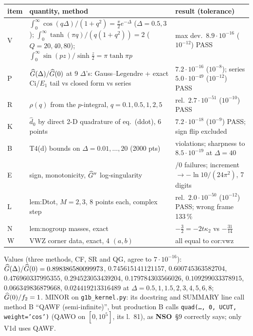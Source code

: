 \documentclass[11pt]{article}
\newcommand{\doc}{\textbf{NSO}}
\begin{document}
\begin{center}\small
\begin{tabularx}{\textwidth}{>{\raggedright\arraybackslash}p{} >{\raggedright\arraybackslash}X >{\raggedright\arraybackslash}p{}}\toprule
item & quantity, method & result (tolerance)\\\midrule
V & $\int_0^\infty\cos(q\Delta)/(1+q^2)=\frac\pi2e^{-\Delta}$ ($\Delta=0.5,3$); $\int_0^\infty\tanh(\pi q)/(q(1+q^2))=2$ ($Q=20,40,80$);
 $\int_0^\infty\sin(pz)/\sinh\frac z2=\pi\tanh\pi p$ & max dev.\ $8.9\cdot10^{-16}$ ($10^{-12}$) PASS\\
P & $\widehat G(\Delta)/\widehat G(0)$ at 9 $\Delta$'s: Gauss--Legendre + exact Ci/$E_1$ tail vs closed form vs series & $7.2\cdot10^{-16}$
 ($10^{-8}$); series $5.0\cdot10^{-49}$ ($10^{-12}$) PASS\\
R & $\rho(q)$ from the $p$-integral, $q=0.1,0.5,1,2,5$ & rel.\ $2.7\cdot10^{-51}$ ($10^{-10}$) PASS\\
K & $\hat d_0$ by direct 2-D quadrature of eq.~(ddot), 6 points & $7.2\cdot10^{-18}$ ($10^{-9}$) PASS; sign flip excluded\\
B & T4(d) bounds on $\Delta=0.01,\dots,20$ (2000 pts) & 0 violations; sharpness to $8.5\cdot10^{-19}$ at $\Delta=40$\\
E & sign, monotonicity, $\widehat G''$ log-singularity & 0/0 failures; increment $\to-\ln10/(24\pi^2)$, 7 digits\\
L & lem:Dtot, $M=2,3$, 8 points each, complex step & rel.\ $2.0\cdot10^{-50}$ ($10^{-12}$) PASS; wrong frame 133\,\%\\
N & lem:nogroup masses, exact & $-\frac32=-2t\kappa_2$ vs $-\frac{31}{14}$\\
W & VWZ corner data, exact, 4 $(a,b)$ & all equal to cor:vwz\\\bottomrule
\end{tabularx}
\end{center}
\noindent Values (three methods, CF, SR and QG, agree to $7\cdot10^{-16}$): $\widehat G(\Delta)/\widehat G(0)=0.898386580099973$,
$0.745615141121157$, $0.600745363582704$, $0.476960337995355$, $0.294523053439204$, $0.179784303566026$,
$0.109299033378915$, $0.066349836879668$, $0.024419213316489$ at $\Delta=0.5,1,1.5,2,3,4,5,6,8$; $\widehat G(0)/f_2=1$.
MINOR on \texttt{g1b\_kernel.py}: its docstring and SUMMARY line call method B ``QAWF (semi-infinite)'', but production B
calls \texttt{quad(\dots, 0, UCUT, weight='cos')} (QAWO on $[0,10^5]$, its l.~81), as \doc\ \S9 correctly says; only V1d uses QAWF.
\end{document}
